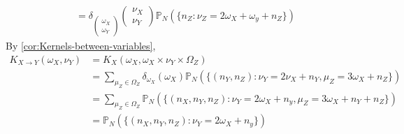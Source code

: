 \documentclass[../main.tex]{subfiles}
\begin{document}
\begin{ex}
\begin{align*}
            &= \delta_{\begin{pmatrix}
                \omega_X\\ \omega_Y
            \end{pmatrix}}\begin{pmatrix}
                \nu_X\\ \nu_Y
            \end{pmatrix}\mathbb{P}_N(\{n_Z: \nu_Z = 2\omega_X+\omega_y+n_Z \})
        \end{align*}
        By \autoref{cor:Kernels-between-variables}, 
        \begin{align*}
            K_{X\to Y}(\omega_X, \nu_Y) &= K_X(\omega_X, \omega_X\times\nu_Y\times \Omega_Z)\\
            &= \sum_{\mu_Z\in \Omega_Z}\delta_{\omega_X}(\omega_X)\mathbb{P}_N(\{(n_Y,n_Z): \nu_Y = 2\nu_X+n_Y, \mu_Z = 3\omega_X+n_Z \}) \\
            &= \sum_{\mu_Z\in \Omega_Z}\mathbb{P}_N(\{(n_X, n_Y,n_Z): \nu_Y = 2\omega_X+n_y, \mu_Z = 3\omega_X+n_Y+n_Z \}) \\
            &= \mathbb{P}_N(\{(n_X, n_Y,n_Z): \nu_Y = 2\omega_X+n_y \})
        \end{align*}  		
    \end{ex}
    
\end{document}
